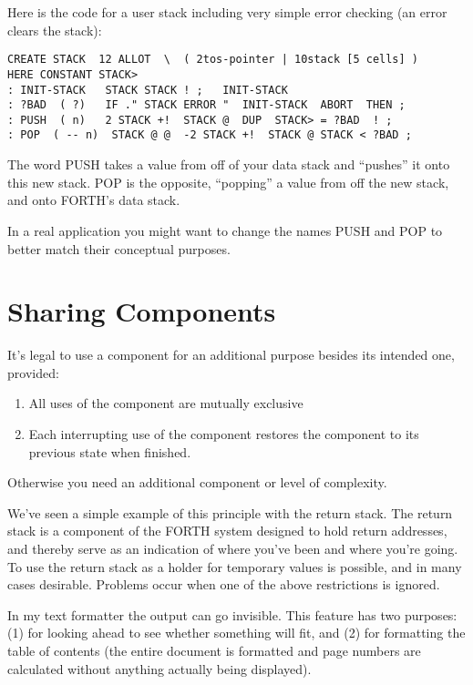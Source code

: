 Here is the code for a user stack including very simple error checking
(an error clears the stack):

\begin{verbatim}
CREATE STACK  12 ALLOT  \  ( 2tos-pointer | 10stack [5 cells] )
HERE CONSTANT STACK>
: INIT-STACK   STACK STACK ! ;   INIT-STACK
: ?BAD  ( ?)   IF ." STACK ERROR "  INIT-STACK  ABORT  THEN ;
: PUSH  ( n)   2 STACK +!  STACK @  DUP  STACK> = ?BAD  ! ;
: POP  ( -- n)  STACK @ @  -2 STACK +!  STACK @ STACK < ?BAD ;
\end{verbatim}

The word PUSH takes a value from off of your data stack and ``pushes''
it onto this new stack. POP is the opposite, ``popping'' a value from off
the new stack, and onto FORTH's data stack.

In a real application you might want to change the names PUSH
and POP to better match their conceptual purposes.

\section{Sharing Components}

\begin{tip}
It's legal to use a component for an additional purpose besides its intended
one, provided:

\begin{enumerate}
\item All uses of the component are mutually exclusive
\item Each interrupting use of the component restores the component to
   its previous state when finished.
\end{enumerate}

Otherwise you need an additional component or level of complexity.
\end{tip}
We've seen a simple example of this principle with the return stack. The
return stack is a component of the FORTH system designed to hold
return addresses, and thereby serve as an indication of where you've been
and where you're going. To use the return stack as a holder for temporary
values is possible, and in many cases desirable. Problems occur when one
of the above restrictions is ignored.

In my text formatter the output can go invisible. This feature has
two purposes: (1) for looking ahead to see whether something will fit, and
(2) for formatting the table of contents (the entire document is formatted
and page numbers are calculated without anything actually being
displayed).

